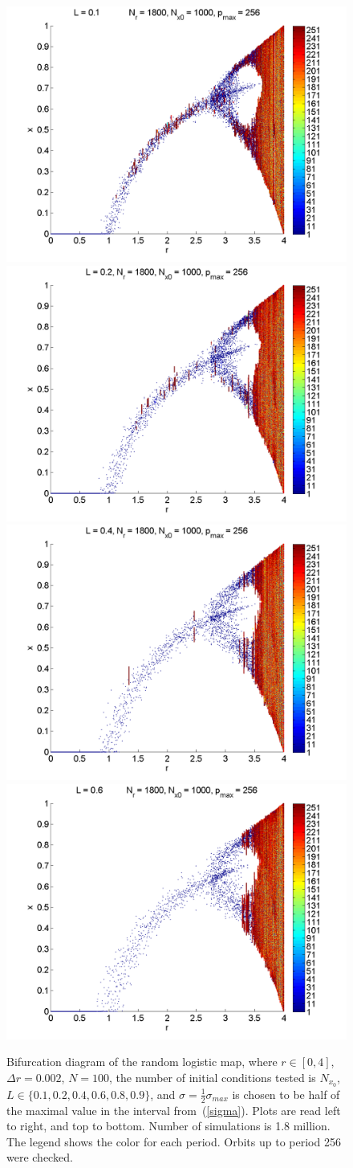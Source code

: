 \begin{figure}[H]\linespread{1}
\caption[Bifurcation diagrams of the random logistic map, $\sigma=\frac{1}{2}\sigma_{max}$]{Bifurcation diagram of the random
logistic map, where $r \in [0,4]$, $\Delta r = 0.002$, $N=100$, the
number of initial conditions tested is $N_{x_0}$, $L\in
\{0.1,0.2,0.4,0.6,0.8,0.9\}$, and $\sigma=\frac{1}{2}\sigma_{max}$ is chosen to be half of the maximal
value in the interval from~(\ref{sigma}). Plots are read left to right, and top to
bottom. Number of simulations is 1.8 million. The legend shows the color for each period. Orbits up to period 256 were checked.}\label{fig:rlogbif_hs}
	\begin{center}
		\includegraphics[width=.5\textwidth]{figs/rlog_bif_halfs_L_01.png}\hfill
		\includegraphics[width=.5\textwidth]{figs/rlog_bif_halfs_L_02.png}\\
		\includegraphics[width=.5\textwidth]{figs/rlog_bif_halfs_L_04.png}\hfill
		\includegraphics[width=.5\textwidth]{figs/rlog_bif_halfs_L_06.png}\\

\end{center}
\end{figure}
